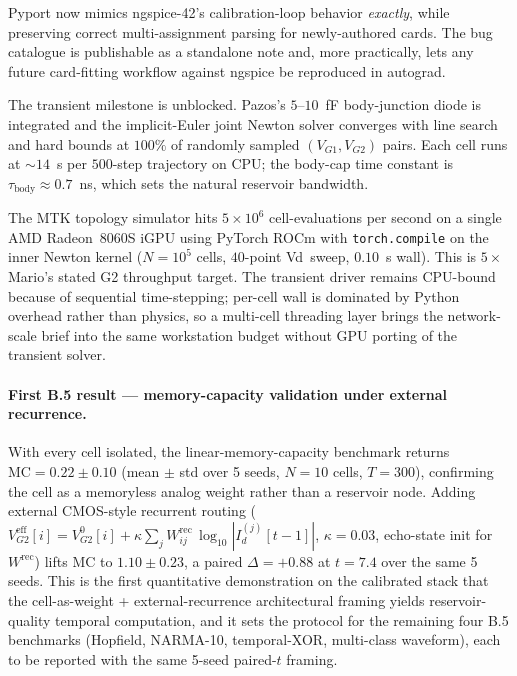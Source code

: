 \documentclass[fontsize=10pt]{article}
\begin{document}
Pyport now mimics ngspice-42's calibration-loop behavior \emph{exactly}, while
preserving correct multi-assignment parsing for newly-authored cards. The bug
catalogue is publishable as a standalone note and, more practically, lets any
future card-fitting workflow against ngspice be reproduced in autograd.

The transient milestone is unblocked. Pazos's $5$--$10$~fF body-junction diode is
integrated and the implicit-Euler joint Newton solver converges with line search and
hard bounds at $100\%$ of randomly sampled $(V_{G1}, V_{G2})$ pairs. Each cell runs at
$\sim 14$~s per $500$-step trajectory on CPU; the body-cap time constant is
$\tau_{\mathrm{body}} \approx 0.7$~ns, which sets the natural reservoir bandwidth.

The MTK topology simulator hits $5 \times 10^6$ cell-evaluations per second on a
single AMD Radeon~8060S iGPU using PyTorch ROCm with \texttt{torch.compile} on the
inner Newton kernel ($N=10^5$ cells, $40$-point Vd~sweep, $0.10$~s wall). This is
$5\times$ Mario's stated G2 throughput target. The transient driver remains CPU-bound
because of sequential time-stepping; per-cell wall is dominated by Python overhead
rather than physics, so a multi-cell threading layer brings the network-scale brief
into the same workstation budget without GPU porting of the transient solver.

\paragraph{First B.5 result --- memory-capacity validation under external recurrence.}
With every cell isolated, the linear-memory-capacity benchmark returns
$\mathrm{MC} = 0.22 \pm 0.10$ (mean $\pm$ std over 5 seeds, $N=10$ cells, $T=300$),
confirming the cell as a memoryless analog weight rather than a reservoir node.
Adding external CMOS-style recurrent routing
($V_{G2}^{\mathrm{eff}}[i] = V_{G2}^{0}[i] + \kappa \sum_j W^{\mathrm{rec}}_{ij}\,
\log_{10}|I_d^{(j)}[t-1]|$, $\kappa = 0.03$, echo-state init for $W^{\mathrm{rec}}$)
lifts $\mathrm{MC}$ to $\mathbf{1.10 \pm 0.23}$, a paired $\Delta = +0.88$ at
$t = 7.4$ over the same 5 seeds. This is the first quantitative demonstration on
the calibrated stack that the cell-as-weight + external-recurrence architectural
framing yields reservoir-quality temporal computation, and it sets the protocol
for the remaining four B.5 benchmarks (Hopfield, NARMA-10, temporal-XOR,
multi-class waveform), each to be reported with the same 5-seed paired-$t$ framing.
\end{document}
